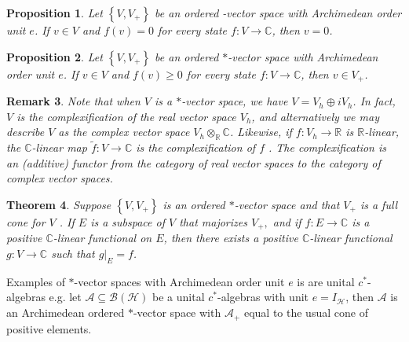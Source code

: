 \documentclass[aps,preprint]{revtex4}%
\newtheorem{theorem}{Theorem}
\newtheorem{proposition}[theorem]{Proposition}
\newtheorem{remark}[theorem]{Remark}
\begin{document}
\begin{proposition}
Let $\left\{  V,V_{+}\right\}  $ be an ordered -vector space with Archimedean
order unit $e$. If $v\in V$ and $f(v)=0$ for every state $f:V\rightarrow
\mathbb{C}$, then $v=0$.
\end{proposition}

\begin{proposition}
Let $\left\{  V,V_{+}\right\}  $ be an ordered $\ast$-vector space with
Archimedean order unit $e$. If $v\in V$ and $f(v)\geq0$ for every state
$f:V\rightarrow\mathbb{C}$, then $v\in V_{+}$.
\end{proposition}

\begin{remark}
Note that when $V$ is a $\ast$-vector space, we have $V=V_{h}\oplus iV_{h}$.
In fact, $V$ is the complexification of the real vector space $V_{h}$, and
alternatively we may describe $V$ as the complex vector space $V_{h}%
\otimes_{\mathbb{R}}\mathbb{C}$. Likewise, if $f:V_{h}\rightarrow\mathbb{R}$
is $\mathbb{R}$-linear, the $\mathbb{C}$-linear map $\widetilde{f}%
:V\rightarrow\mathbb{C}$ is the complexification of $f$ . The complexification
is an (additive) \emph{functor} from the \emph{category of real vector spaces
to the category of complex vector spaces}.
\end{remark}

\begin{theorem}
Suppose $\left\{  V,V_{+}\right\}  $ is an ordered $\ast$-vector space and
that $V_{+}$ is a full cone for $V$ . If $E$ is a subspace of $V$ that
majorizes $V_{+},$ and if $f:E\rightarrow\mathbb{C}$ is a positive
$\mathbb{C}$-linear functional on $E$, then there exists a positive
$\mathbb{C}$-linear functional $g:V\rightarrow\mathbb{C}$ such that $\left.
g\right\vert _{E}=f$.
\end{theorem}

Examples of $\ast$-vector spaces with Archimedean order unit $e$ is are unital
$c^{\ast}$-algebras e.g. let $\mathcal{A}\subseteq\mathcal{B}(\mathcal{H})$ be
a unital $c^{\ast}$-algebras with unit $e=I_{\mathcal{H}}$, then $\mathcal{A}$
is an Archimedean ordered $\ast$-vector space with $\mathcal{A}_{+}$ equal to
the usual cone of positive elements. 
\end{document}
